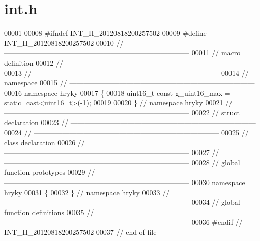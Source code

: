 \hypertarget{int_8h_source}{\section{int.\-h}
}

\begin{DoxyCode}
00001 
00008 \textcolor{preprocessor}{#ifndef INT\_H\_20120818200257502}
00009 \textcolor{preprocessor}{}\textcolor{preprocessor}{#define INT\_H\_20120818200257502}
00010 \textcolor{preprocessor}{}\textcolor{comment}{//
      ------------------------------------------------------------------------------}
00011 \textcolor{comment}{// macro definition}
00012 \textcolor{comment}{//
      ------------------------------------------------------------------------------}
00013 \textcolor{comment}{//
      ------------------------------------------------------------------------------}
00014 \textcolor{comment}{// namespace}
00015 \textcolor{comment}{//
      ------------------------------------------------------------------------------}
00016 \textcolor{keyword}{namespace }hryky
00017 \{
00018     uint16\_t \textcolor{keyword}{const} g\_uint16\_max = \textcolor{keyword}{static\_cast<}uint16\_t\textcolor{keyword}{>}(-1);
00019     
00020 \} \textcolor{comment}{// namespace hryky}
00021 \textcolor{comment}{//
      ------------------------------------------------------------------------------}
00022 \textcolor{comment}{// struct declaration}
00023 \textcolor{comment}{//
      ------------------------------------------------------------------------------}
00024 \textcolor{comment}{//
      ------------------------------------------------------------------------------}
00025 \textcolor{comment}{// class declaration}
00026 \textcolor{comment}{//
      ------------------------------------------------------------------------------}
00027 \textcolor{comment}{//
      ------------------------------------------------------------------------------}
00028 \textcolor{comment}{// global function prototypes}
00029 \textcolor{comment}{//
      ------------------------------------------------------------------------------}
00030 \textcolor{keyword}{namespace }hryky
00031 \{
00032 \} \textcolor{comment}{// namespace hryky}
00033 \textcolor{comment}{//
      ------------------------------------------------------------------------------}
00034 \textcolor{comment}{// global function definitions}
00035 \textcolor{comment}{//
      ------------------------------------------------------------------------------}
00036 \textcolor{preprocessor}{#endif // INT\_H\_20120818200257502}
00037 \textcolor{preprocessor}{}\textcolor{comment}{// end of file}
\end{DoxyCode}
